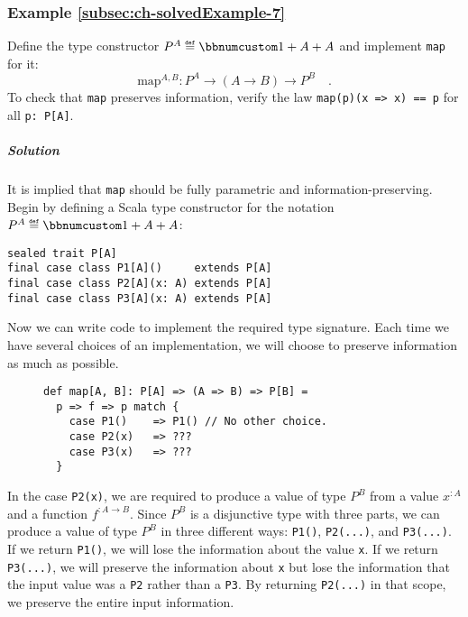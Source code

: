\subsubsection{Example \label{subsec:ch-solvedExample-7}\ref{subsec:ch-solvedExample-7}}

Define the type constructor $P^{A}\triangleq\bbnum 1+A+A$ and implement
\lstinline!map! for it:
\[
\text{map}^{A,B}:P^{A}\rightarrow(A\rightarrow B)\rightarrow P^{B}\quad.
\]
To check that \lstinline!map! preserves information, verify the law
\lstinline!map(p)(x => x) == p! for all \lstinline!p: P[A]!.

\subparagraph{Solution}

It is implied that \lstinline!map! should be fully parametric and
information-preserving. Begin by defining a Scala type constructor
for the notation $P^{A}\triangleq\bbnum 1+A+A$:
\begin{lstlisting}
sealed trait P[A]
final case class P1[A]()     extends P[A]
final case class P2[A](x: A) extends P[A]
final case class P3[A](x: A) extends P[A]
\end{lstlisting}
Now we can write code to implement the required type signature. Each
time we have several choices of an implementation, we will choose
to preserve information as much as possible.

\begin{wrapfigure}{l}{0.45\columnwidth}%
\vspace{-0\baselineskip}

\begin{lstlisting}
def map[A, B]: P[A] => (A => B) => P[B] =
  p => f => p match {
    case P1()    => P1() // No other choice.
    case P2(x)   => ???
    case P3(x)   => ???
  }
\end{lstlisting}
\vspace{-0.9\baselineskip}
\end{wrapfigure}%

\noindent In the case \lstinline!P2(x)!, we are required to produce
a value of type $P^{B}$ from a value $x^{:A}$ and a function $f^{:A\rightarrow B}$.
Since $P^{B}$ is a disjunctive type with three parts, we can produce
a value of type $P^{B}$ in three different ways: \lstinline!P1()!,
\lstinline!P2(...)!, and \lstinline!P3(...)!. If we return \lstinline!P1()!,
we will lose the information about the value \lstinline!x!. If we
return \lstinline!P3(...)!, we will preserve the information about
\lstinline!x! but lose the information that
the input value was a \lstinline!P2! rather than a \lstinline!P3!.
By returning \lstinline!P2(...)! in that scope, we preserve the entire
input information. 

